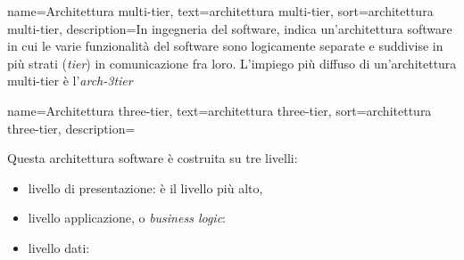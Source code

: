 {
    name=Architettura multi-tier,
    text=architettura multi-tier,
    sort=architettura multi-tier,
    description={In ingegneria del software, indica un'architettura software in cui le varie funzionalità del software sono logicamente separate e suddivise in più strati (\textit{tier}) in comunicazione fra loro. L'impiego più diffuso di un'architettura multi-tier è l'\emph{\gls{arch-3tier}}\glsfirstoccur   
}}

{
    name=Architettura three-tier,
    text=architettura three-tier,
    sort=architettura three-tier,
    description={Questa architettura software è costruita su tre livelli:
        \begin{itemize}
            \item livello di presentazione: è il livello più alto, 
            \item livello applicazione, o \textit{business logic}:
            \item livello dati:
        \end{itemize}
}}


